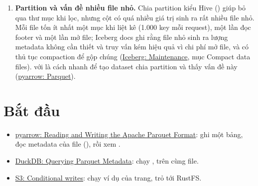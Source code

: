 \begin{enumerate}[resume]
  \item \textbf{Partition và vấn đề nhiều file nhỏ.} Chia partition kiểu Hive () giúp bỏ qua thư mục khi lọc, nhưng cột có quá nhiều giá trị sinh ra rất nhiều file nhỏ. Mỗi file tốn ít nhất một mục khi liệt kê (1.000 key mỗi request), một lần đọc footer và một lần mở file; Iceberg docs ghi rằng file nhỏ sinh ra lượng metadata không cần thiết và truy vấn kém hiệu quả vì chi phí mở file, và có thủ tục compaction để gộp chúng (\href{https://iceberg.apache.org/docs/latest/maintenance/}{Iceberg: Maintenance}, mục Compact data files).  với  là cách nhanh để tạo dataset chia partition và thấy vấn đề này (\href{https://arrow.apache.org/docs/python/parquet.html}{pyarrow: Parquet}).
\end{enumerate}

\section{Bắt đầu}
\begin{itemize}
  \item \href{https://arrow.apache.org/docs/python/parquet.html}{pyarrow: Reading and Writing the Apache Parquet Format}: ghi một bảng, đọc metadata của file (), rồi xem .
  \item \href{https://duckdb.org/docs/2.0/data/parquet/metadata}{DuckDB: Querying Parquet Metadata}: chạy ,  trên cùng file.
  \item \href{https://docs.aws.amazon.com/AmazonS3/latest/userguide/conditional-writes.html}{S3: Conditional writes}: chạy ví dụ  của trang, trỏ  tới RustFS.
\end{itemize}

